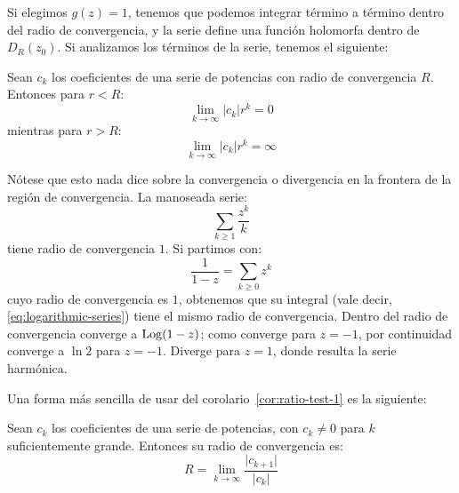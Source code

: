   Si elegimos \(g(z) = 1\),
  tenemos que
  podemos integrar término a término
  dentro del radio de convergencia,
  y la serie define una función holomorfa dentro de \(D_R(z_0)\).
  Si analizamos los términos de la serie,
  tenemos el siguiente:
  \begin{corollary}
    \label{cor:ratio-test-1}
    Sean \(c_k\) los coeficientes de una serie de potencias
    con radio de convergencia \(R\).
    Entonces para \(r < R\):
    \begin{equation*}
      \lim_{k \rightarrow \infty} \lvert c_k \rvert r^k
	= 0
    \end{equation*}
    mientras para \(r > R\):
    \begin{equation*}
      \lim_{k \rightarrow \infty} \lvert c_k \rvert r^k
	= \infty
    \end{equation*}
  \end{corollary}
  Nótese que esto nada dice sobre la convergencia o divergencia
  en la frontera de la región de convergencia.
  La manoseada serie:
  \begin{equation}
    \label{eq:logarithmic-series}
    \sum_{k \ge 1} \frac{z^k}{k}
  \end{equation}
  tiene radio de convergencia \(1\).
  Si partimos con:
  \begin{equation}
    \label{eq:geometric-series}
    \frac{1}{1 - z}
      = \sum_{k \ge 0} z^k
  \end{equation}
  cuyo radio de convergencia es \(1\),
  obtenemos que su integral
  (vale decir,
   \eqref{eq:logarithmic-series})
  tiene el mismo radio de convergencia.
  Dentro del radio de convergencia converge a \(\operatorname{Log} (1 - z)\);
  como converge para \(z = -1\),
  por continuidad converge a \(\ln 2\) para \(z = -1\).
  Diverge para \(z = 1\),
  donde resulta la serie harmónica.

  Una forma más sencilla
  de usar del corolario~\ref{cor:ratio-test-1}
  es la siguiente:
  \begin{corollary}
    \label{cor:ratio-test}
    Sean \(c_k\) los coeficientes de una serie de potencias,
    con \(c_k \ne 0\) para \(k\) suficientemente grande.
    Entonces su radio de convergencia es:
    \begin{equation}
      \label{eq:convergence-radius-ratio}
      R
	= \lim_{k \rightarrow \infty}
	    \frac{\lvert c_{k + 1} \rvert}{\lvert c_k \rvert}
    \end{equation}
  \end{corollary}

